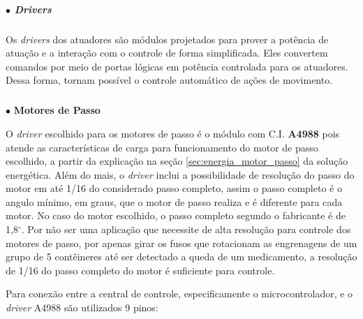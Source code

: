     \subparagraph*{$\bullet$ \textit{Drivers}} \hfill
    
    Os \textit{drivers} dos atuadores são módulos projetados para prover a potência de atuação e a interação com o controle de forma simplificada. Eles convertem comandos por meio de portas lógicas em potência controlada para os atuadores. Dessa forma, tornam possível o controle automático de ações de movimento.
    
    \subparagraph*{} $\bullet$ \textbf{Motores de Passo}\label{sec:eletronica_drivers_passo}
    
    O \textit{driver} escolhido para os motores de passo é o módulo com C.I. \textbf{A4988} pois atende as características de carga para funcionamento do motor de passo escolhido, a partir da explicação na seção \ref{sec:energia_motor_passo} da solução energética. Além do mais, o \textit{driver} inclui a possibilidade de resolução do passo do motor em até 1/16 do considerado passo completo, assim o passo completo é o angulo mínimo, em graus, que o motor de passo realiza e é diferente para cada motor. No caso do motor escolhido, o passo completo segundo o fabricante é de 1,8$^\circ$. Por não ser uma aplicação que necessite de alta resolução para controle dos motores de passo, por apenas girar os fusos que rotacionam as engrenagens de um grupo de 5 contêineres até ser detectado a queda de um medicamento, a resolução de 1/16 do passo completo do motor é suficiente para controle.
    
    Para conexão entre a central de controle, especificamente o microcontrolador, e o \textit{driver} A4988 são utilizados 9 pinos:
    
